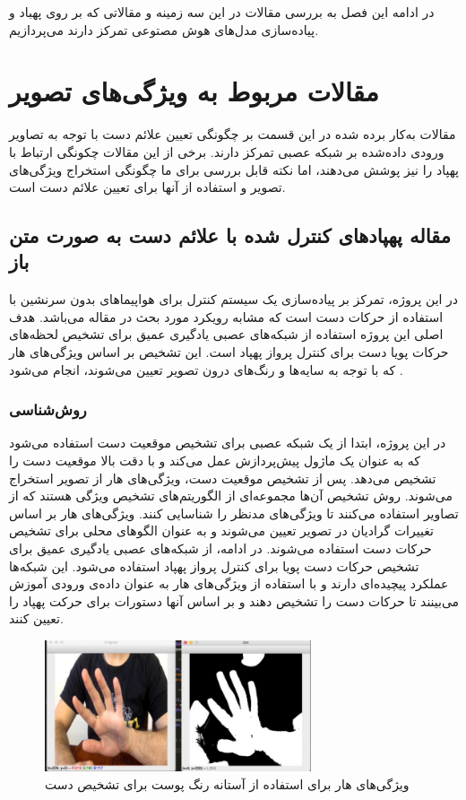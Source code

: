در ادامه این فصل به بررسی مقالات در این سه زمینه و مقالاتی که بر روی پهباد و پیاده‌سازی مدل‌های هوش مصتوعی تمرکز دارند می‌پردازیم.

\section{مقالات مربوط به ویژگی‌های تصویر}
مقالات به‌کار برده شده در این قسمت بر چگونگی تعیین علائم دست با توجه به تصاویر ورودی داده‌شده بر شبکه عصبی تمرکز دارند. برخی از این مقالات چکونگی ارتباط با پهپاد را نیز پوشش می‌دهند، اما نکته قابل بررسی برای ما چگونگی استخراج ویژگی‌های تصویر و استفاده از آنها برای تعیین علائم دست است.


\subsection[مقاله پهپاد‌های کنترل شده با علائم دست به صورت متن باز]{مقاله پهپاد‌های کنترل شده با علائم دست به صورت متن باز\protect{}}
در این پروژه، تمرکز بر پیاده‌سازی یک سیستم کنترل برای هواپیماهای بدون سرنشین با استفاده از حرکات دست است که مشابه رویکرد مورد بحث در مقاله می‌باشد.
هدف اصلی این پروژه استفاده از شبکه‌های عصبی یادگیری عمیق برای تشخیص لحظه‌های حرکات پویا دست برای کنترل پرواز پهپاد 
است. این تشخیص بر اساس ویژگی‌های هار 
 که با توجه به سایه‌ها و رنگ‌های درون تصویر تعیین می‌شوند، انجام می‌شود \cite{natarajan2018hand}.

\subsubsection{\protect\textbf{روش‌شناسی}}
در این پروژه، ابتدا از یک شبکه عصبی برای تشخیص موقعیت دست استفاده می‌شود که به عنوان یک ماژول پیش‌پردازش عمل می‌کند و با دقت بالا موقعیت دست را تشخیص می‌دهد. پس از تشخیص 
موقعیت دست، ویژگی‌های هار از تصویر استخراج می‌شوند. روش تشخیص آن‌ها مجموعه‌ای از الگوریتم‌های تشخیص ویژگی هستند که از تصاویر استفاده می‌کنند تا ویژگی‌های مدنظر را 
شناسایی کنند. ویژگی‌های هار بر اساس تغییرات گرادیان در تصویر تعیین می‌شوند و به عنوان الگوهای محلی برای تشخیص حرکات دست استفاده می‌شوند. در ادامه، از شبکه‌های عصبی یادگیری 
عمیق برای تشخیص حرکات دست پویا برای کنترل پرواز پهپاد استفاده می‌شود. این شبکه‌ها عملکرد پیچیده‌ای دارند و با استفاده از ویژگی‌های هار به عنوان داده‌ی ورودی آموزش می‌بینند تا حرکات دست را 
تشخیص دهند و بر اساس آنها دستورات برای حرکت پهپاد را تعیین کنند.
\begin{figure}[h]
    \centering
    \includegraphics[width=0.7\textwidth]{Haar3.png}
    \caption[ویژگی‌های هار برای استفاده از آستانه رنگ پوست برای تشخیص دست]{ ویژگی‌های هار برای استفاده از آستانه رنگ پوست برای تشخیص دست \cite{natarajan2018hand}}
\end{figure}


